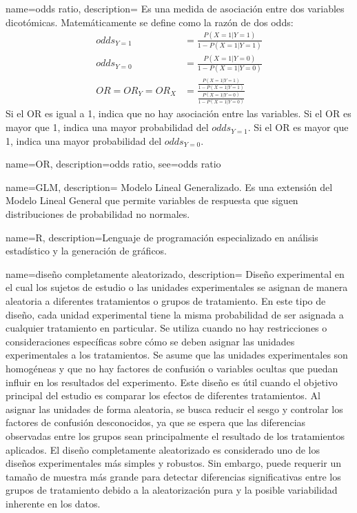 {
    name=odds ratio,
    description={
        Es una medida de asociación entre dos variables dicotómicas.
        Matemáticamente se define como la razón de dos \gls{odds}:
        $$
        \begin{aligned}
        odds_{Y=1} &= \frac{P(X=1|Y=1)}{1-P(X=1|Y=1)}\\
        odds_{Y=0} &= \frac{P(X=1|Y=0)}{1-P(X=1|Y=0)}\\
        OR = OR_Y = OR_X &=\frac{\frac{P(X=1|Y=1)}{1-P(X=1|Y=1)}}{\frac{P(X=1|Y=0)}{1-P(X=1|Y=0)}}
        \end{aligned}
        $$
        Si el OR es igual a 1, indica que no hay asociación entre las variables.
        Si el OR es mayor que 1, indica una mayor probabilidad del $odds_{Y=1}$.
        Si el OR es mayor que 1, indica una mayor probabilidad del $odds_{Y=0}$.
    }
}


{
    name=OR,
    description={odds ratio},
    see={odds ratio}
}


{
    name=GLM,
    description={
        Modelo Lineal Generalizado.
        Es una extensión del Modelo Lineal General que permite variables de respuesta que siguen distribuciones
        de probabilidad no normales.
    }
}


{
    name=R,
    description={Lenguaje de programación especializado en análisis estadístico y la generación de gráficos.}
}



{
    name=diseño completamente aleatorizado,
    description={
        Diseño experimental en el cual los sujetos de estudio o las unidades experimentales se asignan de manera aleatoria
        a diferentes tratamientos o grupos de tratamiento.
        En este tipo de diseño, cada unidad experimental tiene la misma probabilidad de ser asignada a cualquier
        tratamiento en particular. Se utiliza cuando no hay restricciones o consideraciones específicas sobre cómo
        se deben asignar las unidades experimentales a los tratamientos.
        Se asume que las unidades experimentales son homogéneas y que no hay factores de confusión o
        variables ocultas que puedan influir en los resultados del experimento.
        Este diseño es útil cuando el objetivo principal del estudio es comparar los efectos de diferentes
        tratamientos. Al asignar las unidades de forma aleatoria, se busca reducir el sesgo y controlar
        los factores de confusión desconocidos, ya que se espera que las diferencias observadas entre los grupos
        sean principalmente el resultado de los tratamientos aplicados. El diseño completamente aleatorizado
        es considerado uno de los diseños experimentales más simples y robustos.
        Sin embargo, puede requerir un tamaño de muestra más grande para detectar diferencias significativas
        entre los grupos de tratamiento debido a la aleatorización pura y la posible variabilidad
        inherente en los datos.
        }
}


